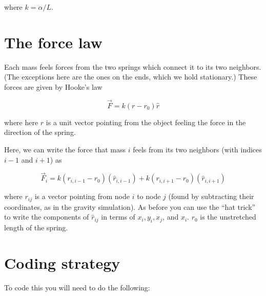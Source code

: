 \documentclass[12ampt]{article}
\begin{document}
where $k=\alpha/L$.

\section{The force law}

Each mass feels forces from the two springs which connect it to its two
neighbors. (The exceptions here are the ones on the ends, which we hold 
stationary.) These forces are given by Hooke's law

\begin{equation}
  \vec F = k(r-r_0) \hat r
\end{equation}

where here $\hat r$ is a unit vector pointing from the object
feeling the force in the direction of the spring.  

Here, we can write the force that mass $i$ feels from its two neighbors 
(with indices $i-1$ and $i+1$) as

\begin{equation}
  \vec F_i = k(r_{i,i-1}-r_0) (\hat r_{i,i-1}) + k(r_{i,i+1}-r_0) (\hat r_{i,i+1})
\end{equation}

where $r_{ij}$ is a vector pointing from node $i$ to node $j$ (found by 
subtracting their coordinates, as in the gravity simulation). As before you 
can use the ``hat trick'' to write the components of $\hat r_{ij}$ in terms
of $x_i, y_i, x_j$, and $x_i$. $r_0$ is the unstretched length of the spring.

\section{Coding strategy}

To code this you will need to do the following:
\end{document}
